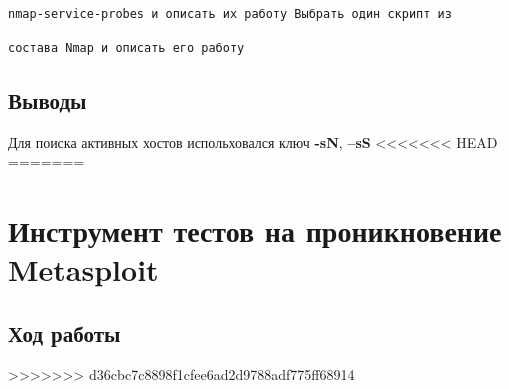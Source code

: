 \documentclass[12pt,a4paper]{article}
\begin{document}
\verb+nmap-service-probes и описать их работу Выбрать один скрипт из +

\verb+состава Nmap и описать его работу+
\subsection{Выводы}
Для поиска активных хостов испольховался ключ \textbf{-sN}, \textbf{--sS}
<<<<<<< HEAD
=======
\section{Инструмент тестов на проникновение Metasploit}
\subsection{Ход работы}
>>>>>>> d36cbc7c8898f1cfee6ad2d9788adf775ff68914
\end{document}
